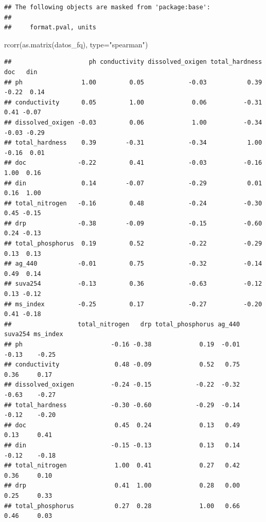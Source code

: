 \documentclass[
]{book}
\newenvironment{Shaded}{\begin{snugshade}}{\end{snugshade}}
\newcommand{\AttributeTok}[1]{\textcolor[rgb]{0.77,0.63,0.00}{#1}}
\newcommand{\FunctionTok}[1]{\textcolor[rgb]{0.00,0.00,0.00}{#1}}
\newcommand{\NormalTok}[1]{#1}
\newcommand{\StringTok}[1]{\textcolor[rgb]{0.31,0.60,0.02}{#1}}
\begin{document}
\begin{verbatim}
## The following objects are masked from 'package:base':
## 
##     format.pval, units
\end{verbatim}

\begin{Shaded}
\begin{Highlighting}[]
\FunctionTok{rcorr}\NormalTok{(}\FunctionTok{as.matrix}\NormalTok{(datos\_fq), }\AttributeTok{type=}\StringTok{"spearman"}\NormalTok{) }
\end{Highlighting}
\end{Shaded}

\begin{verbatim}
##                     ph conductivity dissolved_oxigen total_hardness   doc   din
## ph                1.00         0.05            -0.03           0.39 -0.22  0.14
## conductivity      0.05         1.00             0.06          -0.31  0.41 -0.07
## dissolved_oxigen -0.03         0.06             1.00          -0.34 -0.03 -0.29
## total_hardness    0.39        -0.31            -0.34           1.00 -0.16  0.01
## doc              -0.22         0.41            -0.03          -0.16  1.00  0.16
## din               0.14        -0.07            -0.29           0.01  0.16  1.00
## total_nitrogen   -0.16         0.48            -0.24          -0.30  0.45 -0.15
## drp              -0.38        -0.09            -0.15          -0.60  0.24 -0.13
## total_phosphorus  0.19         0.52            -0.22          -0.29  0.13  0.13
## ag_440           -0.01         0.75            -0.32          -0.14  0.49  0.14
## suva254          -0.13         0.36            -0.63          -0.12  0.13 -0.12
## ms_index         -0.25         0.17            -0.27          -0.20  0.41 -0.18
##                  total_nitrogen   drp total_phosphorus ag_440 suva254 ms_index
## ph                        -0.16 -0.38             0.19  -0.01   -0.13    -0.25
## conductivity               0.48 -0.09             0.52   0.75    0.36     0.17
## dissolved_oxigen          -0.24 -0.15            -0.22  -0.32   -0.63    -0.27
## total_hardness            -0.30 -0.60            -0.29  -0.14   -0.12    -0.20
## doc                        0.45  0.24             0.13   0.49    0.13     0.41
## din                       -0.15 -0.13             0.13   0.14   -0.12    -0.18
## total_nitrogen             1.00  0.41             0.27   0.42    0.36     0.10
## drp                        0.41  1.00             0.28   0.00    0.25     0.33
## total_phosphorus           0.27  0.28             1.00   0.66    0.46     0.03

\end{verbatim}
\end{document}
